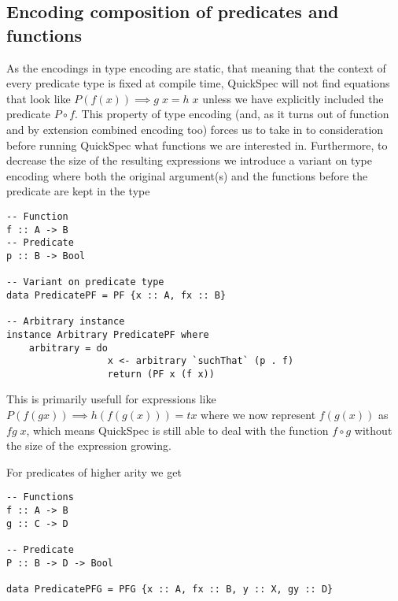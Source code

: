 \subsection{Encoding composition of predicates and functions}
As the encodings in type encoding are static, that meaning
that the context of every predicate type is fixed
at compile time, QuickSpec will not find equations
that look like $P(f(x))\implies g\;x=h\;x$
unless we have explicitly included the 
predicate $P \circ f$. This property of type encoding
(and, as it turns out of function and by extension combined encoding too)
forces us to take in to consideration before running QuickSpec
what functions we are interested in. 
Furthermore, to decrease the size of the resulting expressions we introduce
a variant on type encoding where both the original argument(s) and the
functions before the predicate are kept in the type
\begin{verbatim}
-- Function
f :: A -> B
-- Predicate
p :: B -> Bool

-- Variant on predicate type
data PredicatePF = PF {x :: A, fx :: B}

-- Arbitrary instance
instance Arbitrary PredicatePF where
    arbitrary = do
                  x <- arbitrary `suchThat` (p . f)
                  return (PF x (f x))

\end{verbatim}
This is primarily usefull for expressions like $P (f (g x))\implies h(f(g(x))) = t x$
where we now represent $f(g(x))$ as $fg\;x$, which means QuickSpec is still able to
deal with the function $f\circ g$ without the size of the expression growing.

For predicates of higher arity we get
\begin{verbatim}
-- Functions
f :: A -> B
g :: C -> D

-- Predicate
P :: B -> D -> Bool

data PredicatePFG = PFG {x :: A, fx :: B, y :: X, gy :: D}
\end{verbatim}

